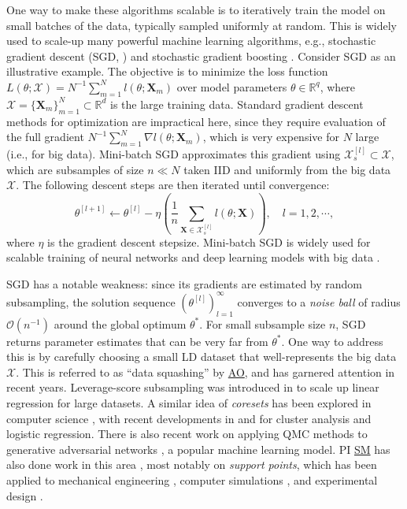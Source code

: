 \documentclass[11pt]{NSFamsart}
\newcommand{\SM}{\hyperlink{SMlink}{SM}\xspace}
\newcommand{\AO}{\hyperlink{AOlink}{AO}\xspace}
\newcommand{\bX}{{\boldsymbol{X}}}
\begin{document}
One way to make these algorithms scalable is to iteratively train the model on small batches of the data, typically sampled uniformly at random. This is widely used to scale-up many powerful machine learning algorithms, e.g., stochastic gradient descent (SGD, \cite{Bot2010}) and stochastic gradient boosting \cite{friedman2002stochastic}. Consider SGD as an illustrative example. The objective is to minimize the loss function $L(\theta;\mathcal{X}) = N^{-1} \sum_{m=1}^N l(\theta;\bX_m)$ over model parameters $\theta \in \mathbb{R}^q$, where $\mathcal{X} = \{\bX_m\}_{m=1}^N \subset \mathbb{R}^d$ is the large training data. Standard gradient descent methods for optimization \cite{nocedal2006numerical} are impractical here, since they require evaluation of the full gradient $N^{-1} \sum_{m=1}^N \nabla l(\theta;\bX_m)$, which is very expensive for $N$ large (i.e., for big data). Mini-batch SGD \cite{Bot2010} approximates this gradient using $\mathcal{X}_{s}^{[l]} \subset \mathcal{X}$, which are subsamples of size $n \ll N$ taken IID and uniformly from the big data $\mathcal{X}$. The following descent steps are then iterated until convergence:
\begin{equation}\label{eq:sgdopt}
\theta^{[l+1]} \leftarrow \theta^{[l]} - \eta \left( \frac{1}{n} \sum_{\bX \in \mathcal{X}_{s}^{[l]}} l(\theta;\bX)\right) , \quad l = 1, 2, \cdots,
\end{equation}
where $\eta$ is the gradient descent stepsize. Mini-batch SGD is widely used for scalable training of neural networks and deep learning models with big data \citep{srivastava2014dropout}.

SGD has a notable weakness: since its gradients are estimated by random subsampling, the solution sequence $(\theta^{[l]})_{l=1}^\infty$ converges to a \textit{noise ball} of radius $\mathcal{O}(n^{-1})$ around the global optimum $\theta^*$. For small subsample size $n$, SGD returns parameter estimates that can be very far from  $\theta^*$. One way to address this is by carefully choosing a small LD dataset that well-represents the big data $\mathcal{X}$. This is referred to as ``data squashing'' \cite{owen2003data} by \AO, and has garnered attention in recent years. Leverage-score subsampling was introduced in \cite{ma2015statistical} to scale up linear regression for large datasets. A similar idea of \textit{coresets} has been explored in computer science \cite{chan2006faster}, with recent developments in \cite{bachem2017practical} and \cite{huggins2016coresets} for cluster analysis and logistic regression. There is also recent work \cite{hofert2018quasi, chong2020effectively} on applying QMC methods to generative adversarial networks \cite{goodfellow2014generative}, a popular machine learning model. PI \SM has also done work in this area \cite{mak2018support,mak2018minimax,mak2017projected,krishna2019distributional}, most notably on \textit{support points}, which has been applied to mechanical engineering \cite{fernandez2018estimating}, computer simulations \citep{pronzato2020bayesian}, and experimental design \cite{krishna2020robust}.
\end{document}
